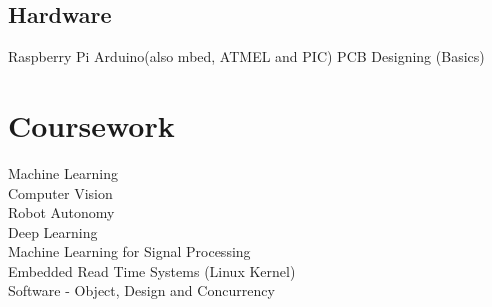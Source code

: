 \documentclass[]{resume-openfont}
\begin{document}
\begin{minipage}[t]{0.36\textwidth}
\subsection{Hardware}
Raspberry Pi \textbullet{} Arduino(also mbed, ATMEL and PIC)  \textbullet{} PCB Designing (Basics)


\section{Coursework}
Machine Learning \\
Computer Vision \\
Robot Autonomy \\
Deep Learning \\
Machine Learning for Signal Processing \\
Embedded Read Time Systems (Linux Kernel) \\
Software - Object, Design and Concurrency \\
\sectionsep


%
%

\end{minipage} 
\hfill
\end{document}

